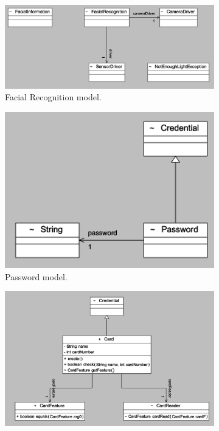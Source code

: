 \begin{figure}
    \begin{subfigure}[b]{0.3\linewidth}
    	\includegraphics[width=\linewidth]{facialrognitionModel.PNG}
        \caption{Facial Recognition model.}
        \label{facial recognition}
    \end{subfigure}
    \begin{subfigure}[b]{0.3\linewidth}
    	\includegraphics[width=\linewidth]{passwordModel.PNG}
        \caption{Password model.}
        \label{password model}
    \end{subfigure}
    \begin{subfigure}[b]{0.3\linewidth}
    	\includegraphics[width=\linewidth]{cardModel.PNG}

\end{subfigure}
\end{figure}
